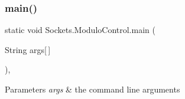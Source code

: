 \subsubsection{\texorpdfstring{main()}{main()}}
{\footnotesize\ttfamily static void Sockets.\+Modulo\+Control.\+main (\begin{DoxyParamCaption}\item[{String}]{args\mbox{[}$\,$\mbox{]} }\end{DoxyParamCaption})\hspace{0.3cm}{\ttfamily [inline]}, {\ttfamily [static]}}


\begin{DoxyParams}{Parameters}
{\em args} & the command line arguments \\
\hline
\end{DoxyParams}

